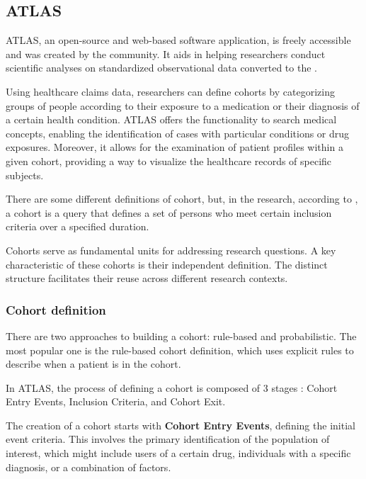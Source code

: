 \subsection{ATLAS}


ATLAS, an open-source and web-based software application, is freely accessible and was created by the {\ohdsi} community. It aids in helping researchers conduct scientific analyses on standardized observational data converted to the {\omop}.

Using healthcare claims data, researchers can define cohorts by categorizing groups of people according to their exposure to a medication or their diagnosis of a certain health condition. ATLAS offers the functionality to search medical concepts, enabling the identification of cases with particular conditions or drug exposures. Moreover, it allows for the examination of patient profiles within a given cohort, providing a way to visualize the healthcare records of specific subjects.

There are some different definitions of cohort, but, in the {\ohdsi} research, according to \citet{informatics_chapter_nodate}, a cohort is a query that defines a set of persons who meet certain inclusion criteria over a specified duration.

Cohorts serve as fundamental units for addressing research questions. A key characteristic of these cohorts is their independent definition. The distinct structure facilitates their reuse across different research contexts.


\subsubsection{Cohort definition}

There are two approaches to building a cohort: rule-based and probabilistic. The most popular one is the rule-based cohort definition, which uses explicit rules to describe when a patient is in the cohort.

In ATLAS, the process of defining a cohort is composed of 3 stages \cite{informatics_chapter_nodate}: Cohort Entry Events, Inclusion Criteria, and Cohort Exit.

The creation of a cohort starts with \textbf{Cohort Entry Events}, defining the initial event criteria. This involves the primary identification of the population of interest, which might include users of a certain drug, individuals with a specific diagnosis, or a combination of factors. 


